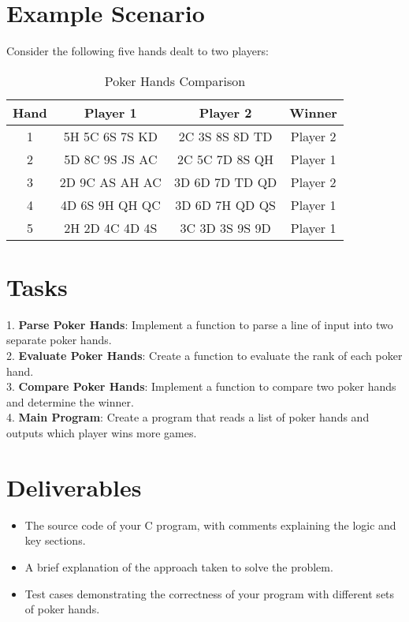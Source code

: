 \documentclass{article}
\begin{document}
\section*{Example Scenario}
Consider the following five hands dealt to two players:

\begin{table}[h]
    \centering
    \begin{tabular}{|c|c|c|c|}
    \hline
    \textbf{Hand} & \textbf{Player 1} & \textbf{Player 2} & \textbf{Winner} \\ \hline
    1 & 5H 5C 6S 7S KD & 2C 3S 8S 8D TD & Player 2 \\ \hline
    2 & 5D 8C 9S JS AC & 2C 5C 7D 8S QH &  Player 1\\ \hline
    3 & 2D 9C AS AH AC & 3D 6D 7D TD QD &  Player 2 \\ \hline
    4 & 4D 6S 9H QH QC & 3D 6D 7H QD QS & Player 1 \\ \hline
    5 & 2H 2D 4C 4D 4S & 3C 3D 3S 9S 9D & Player 1 \\ \hline
    \end{tabular}
    \caption{Poker Hands Comparison}
\end{table}

\section*{Tasks}
1. \textbf{Parse Poker Hands}: Implement a function to parse a line of input into two separate poker hands.\\
2. \textbf{Evaluate Poker Hands}: Create a function to evaluate the rank of each poker hand.\\
3. \textbf{Compare Poker Hands}: Implement a function to compare two poker hands and determine the winner.\\
4. \textbf{Main Program}: Create a program that reads a list of poker hands and outputs which player wins more games.

\section*{Deliverables}
\begin{itemize}
    \item The source code of your C program, with comments explaining the logic and key sections.
    \item A brief explanation of the approach taken to solve the problem.
    \item Test cases demonstrating the correctness of your program with different sets of poker hands.
\end{itemize}
\end{document}
